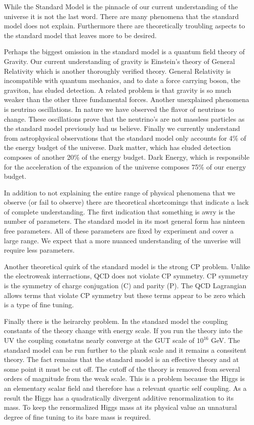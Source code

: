 
While the Standard Model is the pinnacle of our current understanding of the universe it is not the last word.
There are many phenomena that the standard model does not explain.
Furthermore there are theoretically troubling aspects to the standard model that leaves more to be desired.

Perhaps the biggest omission in the standard model is a quantum field theory of Gravity.
Our current understanding of gravity is Einstein's theory of General Relativity which is another thoroughly verified theory.
General Relativity is incompatible with quantum mechanics, and to date a force carrying boson, the graviton, has eluded detection.
A related problem is that gravity is so much weaker than the other three fundamental forces.
Another unexplained phenomena is neutrino oscillations.
In nature we have observed the flavor of neutrinos to change.
These oscillations prove that the neutrino's are not massless particles as the standard model previously had us believe.
Finally we currently understand from astrophysical observations that the standard model only accounts for 4\% of the energy budget of the universe.
Dark matter, which has eluded detection composes of another 20\% of the energy budget.
Dark Energy, which is responsible for the acceleration of the expansion of the universe composes 75\% of our energy budget.

In addition to not explaining the entire range of physical phenomena that we observe (or fail to observe) there are theoretical shortcomings that indicate a lack of complete understanding.
The first indication that something is awry is the number of parameters.
The standard model in its most general form has ninteen free parameters.
All of these parameters are fixed by experiment and cover a large range.
We expect that a more nuanced understanding of the unverise will require less parameters.

Another theoretical quirk of the standard model is the strong CP problem.
Unlike the electroweak interractions, QCD does not violate CP symmetry.
CP symmetry is the symmetry of charge conjugation (C) and parity (P).
The QCD Lagrangian allows terms that violate CP symmetry but these terms appear to be zero which is a type of fine tuning.

Finally there is the heirarchy problem.
In the standard model the coupling constants of the theory change with energy scale.
If you run the theory into the UV the coupling constatns nearly converge at the GUT scale of $10^{16}$ GeV.
The standard model can be run further to the plank scale and it remains a conssitent theory.
The fact remains that the standard model is an effective theory and at some point it must be cut off.
The cutoff of the theory is removed from several orders of magnitude from the weak scale.
This is a problem because the Higgs is an elementary scalar field and therefore has a relevant quartic self coupling.
As a result the Higgs has a quadratically divergent additive renormalization to its mass.
To keep the renormalized Higgs mass at its physical value an unnatural degree of fine tuning to its bare mass is required.


